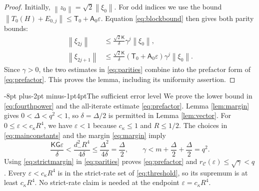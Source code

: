 \documentclass[pdflatex,sn-mathphys-num]{sn-jnl}
\makeatletter
\renewcommand\subsection{\@startsection{subsection}{2}{\z@}%
  {-8pt plus-2pt minus-1pt}{4pt}{\subsectionfont}}
\theoremstyle{thmstyleone}
\theoremstyle{thmstyletwo}
\newcommand{\cT}{\mathsf T}
\newcommand{\cK}{\mathsf K}
\newcommand{\cG}{\mathsf G}
\newcommand{\norm}[1]{\left\lVert #1\right\rVert}
\makeatother
\begin{document}
\begin{proof}
Initially, $\norm{z_0}=\sqrt2\norm{\xi_0}$.
For odd indices we use the bound
$\norm{T_0(H)+E_{0,j}}\leq\cT_0+\mathsf A_0\varepsilon$.
Equation \eqref{eq:blockbound} then gives both parity bounds:
\begin{equation}\label{eq:parities}
\begin{split}
 \norm{\xi_{2j}}&\leq
       \frac{\sqrt2\cK}{\delta}\gamma^j\norm{\xi_0},\\
 \norm{\xi_{2j+1}}&\leq
       \frac{\sqrt2\cK}{\delta}(\cT_0+\mathsf A_0\varepsilon)
                    \gamma^j\norm{\xi_0}.
\end{split}
\end{equation}
Since $\gamma>0$, the two estimates in \eqref{eq:parities}
combine into the prefactor form of \eqref{eq:prefactor}.
This proves the lemma, including its uniformity assertion.
\end{proof}

\subsection{The sufficient error level}
We prove the lower bound in \eqref{eq:fourthpower} and the
all-iterate estimate \eqref{eq:prefactor}.
Lemma \ref{lem:margin} gives $0<\Delta<q^2<1$, so
$\delta=\Delta/2$ is permitted in Lemma \ref{lem:vector}.
For $0\leq\varepsilon<c_\kappa R^4$, we have
$\varepsilon<1$ because $c_\kappa\leq1$ and $R\leq1/2$.
The choices in \eqref{eq:mainconstants} and the margin
\eqref{eq:margin} imply
\begin{equation}\label{eq:strictmargin}
 \frac{\cK\cG\varepsilon}{\delta}
 <\frac{d_-^2R^4}{4\delta}
 \leq\frac{\Delta^2}{4\delta}
 =\frac{\Delta}{2},\qquad
 \gamma<m+\frac{\Delta}{2}+\frac{\Delta}{2}=q^2 .
\end{equation}
Using \eqref{eq:strictmargin} in \eqref{eq:parities} proves
\eqref{eq:prefactor} and
$r_{\mathcal C}(\varepsilon)\leq\sqrt\gamma<q$.
Every $\varepsilon<c_\kappa R^4$ is in the strict-rate set
of \eqref{eq:threshold}, so its supremum is at least
$c_\kappa R^4$. No strict-rate claim is needed at
the endpoint $\varepsilon=c_\kappa R^4$.
\end{document}
